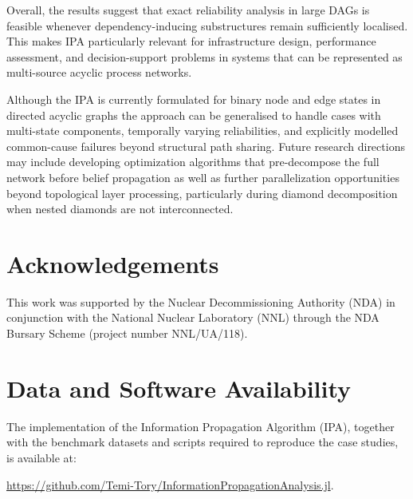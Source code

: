 \documentclass[preprint,12pt]{elsarticle}
\begin{document}
Overall, the results suggest that exact reliability analysis in large DAGs is feasible whenever dependency-inducing substructures remain sufficiently localised. This makes IPA particularly relevant for infrastructure design, performance assessment, and decision-support problems in systems that can be represented as multi-source acyclic process networks.

Although the IPA is currently formulated for binary node and edge states in directed acyclic graphs the approach can be generalised to handle cases with multi-state components, temporally varying reliabilities, and explicitly modelled common-cause failures beyond structural path sharing.
Future research directions may include developing optimization algorithms that pre-decompose the full network before belief propagation as well as further parallelization opportunities beyond topological layer processing, particularly during diamond decomposition when nested diamonds are not interconnected. 




\section*{Acknowledgements}
This work was supported by the Nuclear Decommissioning Authority (NDA) in conjunction with the National Nuclear Laboratory (NNL) through the NDA Bursary Scheme (project number NNL/UA/118). 


\section*{Data and Software Availability}

The implementation of the Information Propagation Algorithm (IPA), together with the benchmark datasets and scripts required to reproduce the case studies, is available at:

\url{https://github.com/Temi-Tory/InformationPropagationAnalysis.jl}. 
\end{document}
